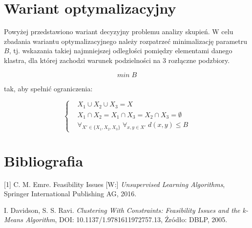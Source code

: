 \documentclass[10pt,a4paper]{article}
\begin{document}
\section{Wariant optymalizacyjny}\label{sec:opt}
\par
Powyżej przedstawiono wariant decyzyjny problemu analizy skupień. W celu zbadania wariantu optymalizacyjnego należy
rozpatrzeć minimalizację parametru $B$, tj. wskazania takiej najmniejszej odległości pomiędzy elementami danego klastra,
dla której zachodzi warunek podzielności na 3 rozłączne podzbiory.

\begin{equation}
  min \; B
\end{equation}

tak, aby spełnić ograniczenia:

\begin{equation}
  \left\{
    \begin{aligned}
      &X_1 \cup X_2 \cup X_3 = X \\
      &X_1 \cap X_2 = X_1 \cap X_3 = X_2 \cap X_3 = \emptyset \\
      &\forall_{X' \in \{ X_1, X_2, X_3 \}} \; \forall_{x,y \in X'} \; d(x, y) \leq B
    \end{aligned}
    \right.
\end{equation}


\section{Bibliografia}\label{sec:bibliografia}
[1] C. M. Emre. Feasibility Issues [W:] \textit{Unsupervised Learning Algorithms}, 
    Springer International Publishing AG, 2016. \par\noindent
[2] I. Davidson, S. S. Ravi. \textit{Clustering With Constraints: Feasibility Issues and the k-Means Algorithm},
    DOI: 10.1137/1.9781611972757.13, Źródło: DBLP, 2005.
\end{document}
